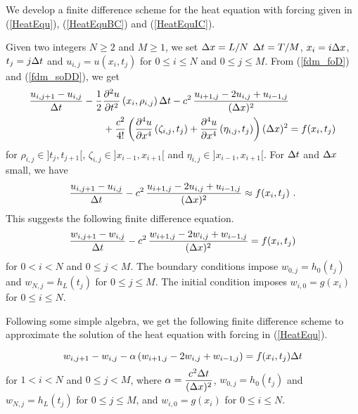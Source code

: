 We develop a finite difference scheme for the heat equation with
forcing given in (\ref{HeatEqu}), (\ref{HeatEquBC}) and
(\ref{HeatEquIC}).

Given two integers $N\geq 2$ and $M\geq 1$, we set $\Delta{x} = L/N$
$\Delta{t} = T/M$, $x_i = i \Delta{x}$, $t_j = j \Delta{t}$ and
$\displaystyle u_{i,j} = u\left(x_i,t_j\right)$
for $0\leq i \leq N$ and $0\leq j \leq M$.
From (\ref{fdm_foD}) and (\ref{fdm_soDD}), we get
\begin{equation}\label{fdm_sch1_tr}
\begin{split}
\frac{u_{i,j+1}- u_{i,j}}{\Delta{t}} &-
\frac{1}{2} \frac{\partial^{2}{u}}{\partial{t}^{2}}\left(x_i,\rho_{i,j}\right) \Delta{t} - c^2 \,
\frac{u_{i+1,j} - 2u_{i,j} + u_{i-1,j}}{(\Delta{x})^2} \\
& \quad\quad + \frac{c^2}{4!}
\left( \frac{\partial^{4}{u}}{\partial{x}^{4}}\left(\zeta_{i,j},t_j\right)
+ \frac{\partial^{4}{u}}{\partial{x}^{4}}\left(\eta_{i,j},t_j\right) \right) (\Delta{x})^2 = f(x_i,t_j)
\end{split}
\end{equation}
for $\rho_{i,j} \in ]t_j,t_{j+1}[$,
$\zeta_{i,j} \in ]x_{i-1},x_{i+1}[$ and
$\eta_{i,j} \in ]x_{i-1},x_{i+1}[$.  For $\Delta{t}$ and $\Delta{x}$ small,
we have
\[
\frac{u_{i,j+1}- u_{i,j}}{\Delta{t}} - c^2 \,
\frac{u_{i+1,j} - 2u_{i,j} + u_{i-1,j}}{(\Delta{x})^2} \approx f(x_i,t_j) \ .
\]
This suggests the following finite difference equation.
\begin{equation} \label{fdm_sch1}
\frac{w_{i,j+1}- w_{i,j}}{\Delta{t}} - c^2 \,
\frac{w_{i+1,j} - 2w_{i,j} + w_{i-1,j}}{(\Delta{x})^2} = f(x_i,t_j)
\end{equation}
for $0 < i <N$ and $0 \leq j < M$.  The boundary conditions impose
$w_{0,j} = h_0(t_j)$ and $w_{N,j} =  h_L(t_j)$ for $0\leq j \leq M$.
The initial condition imposes $w_{i,0} = g(x_i)$ for $0 \leq i \leq N$.

Following some simple algebra, we get the following finite difference
scheme to approximate the solution of the heat equation with forcing
in (\ref{HeatEqu}).

\begin{algo} \label{fdm_sch1S}
\[
w_{i,j+1} - w_{i,j} - \alpha \left( w_{i+1,j} - 2w_{i,j} +
w_{i-1,j}\right) = f(x_i,t_j) \Delta{t}
\]
for $1 < i <N$ and $0 \leq j < M$, where
$\displaystyle \alpha = \frac{c^2\Delta{t}}{(\Delta{x})^2}$,
$w_{0,j} = h_0(t_j)$ and $w_{N,j} = h_L(t_j)$ for $0\leq j \leq M$, and
$w_{i,0} = g(x_i)$ for $0 \leq i \leq N$.
\end{algo}


